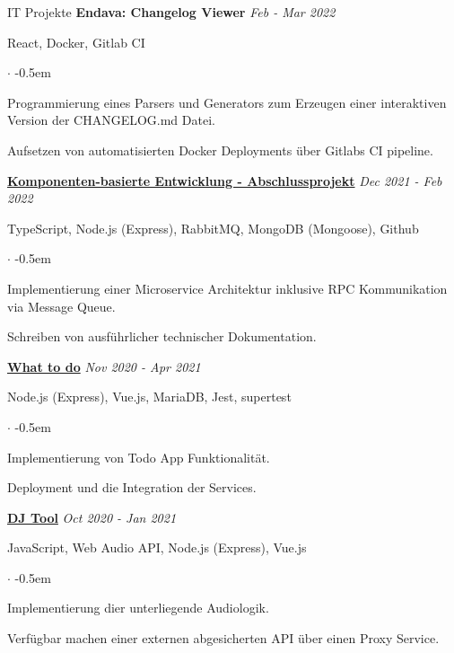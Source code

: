 \documentclass{cv}
\begin{document}
\begin{rSection}{IT Projekte}
  \textbf{Endava: Changelog Viewer}
  \hfill
  {\em Feb - Mar 2022}

  React, Docker, Gitlab CI
  \begin{list}{$\cdot$}{}
  \itemsep -0.5em \vspace{-0.5em}
    \smallskip
  \item Programmierung eines Parsers und Generators zum Erzeugen einer interaktiven Version der CHANGELOG.md Datei.
  \item Aufsetzen von automatisierten Docker Deployments über Gitlabs CI pipeline.
  \end{list}

  \textbf{\href{https://github.com/htw-kbe-jneidel/main}{Komponenten-basierte Entwicklung - Abschlussprojekt}}
  \hfill
  {\em Dec 2021 - Feb 2022}

  TypeScript, Node.js (Express), RabbitMQ, MongoDB (Mongoose), Github
  \begin{list}{$\cdot$}{}
  \itemsep -0.5em \vspace{-0.5em}
    \smallskip
  \item Implementierung einer Microservice Architektur inklusive RPC Kommunikation via Message Queue.
  \item Schreiben von ausführlicher technischer Dokumentation.
  \end{list}

  \textbf{\href{https://github.com/jneidel/what-to-do}{What to do}}
  \hfill
  {\em Nov 2020 - Apr 2021}

  Node.js (Express), Vue.js, MariaDB, Jest, supertest
  \begin{list}{$\cdot$}{}
  \itemsep -0.5em \vspace{-0.5em}
    \smallskip
  \item Implementierung von Todo App Funktionalität.
  \item Deployment und die Integration der Services.
  \end{list}

  \textbf{\href{https://github.com/vyvytn/avt}{DJ Tool}}
  \hfill
  {\em Oct 2020 - Jan 2021}

  JavaScript, Web Audio API, Node.js (Express), Vue.js
  \begin{list}{$\cdot$}{}
  \itemsep -0.5em \vspace{-0.5em}
    \smallskip
  \item Implementierung dier unterliegende Audiologik.
  \item Verfügbar machen einer externen abgesicherten API über einen Proxy Service.
  \end{list}


\end{rSection}
\end{document}
